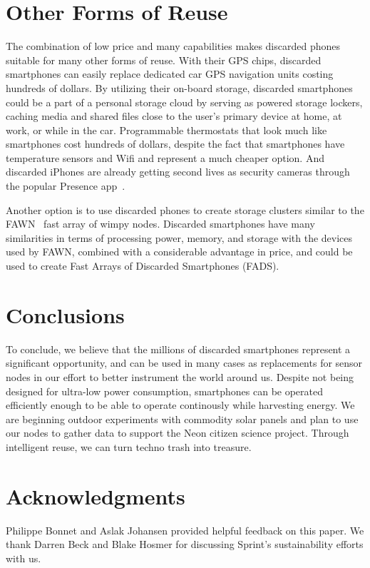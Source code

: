 \section{Other Forms of Reuse}
\label{sec-other}

The combination of low price and many capabilities makes discarded phones
suitable for many other forms of reuse. With their GPS chips, discarded
smartphones can easily replace dedicated car GPS navigation units costing
hundreds of dollars. By utilizing their on-board storage, discarded
smartphones could be a part of a personal storage cloud by serving as powered
storage lockers, caching media and shared files close to the user's primary
device at home, at work, or while in the car. Programmable thermostats that
look much like smartphones cost hundreds of dollars, despite the fact that
smartphones have temperature sensors and Wifi and represent a much cheaper
option. And discarded iPhones are already getting second lives as security
cameras through the popular Presence app~\cite{presence-peoplepower}.

Another option is to use discarded phones to create storage clusters similar
to the FAWN~\cite{fawn} fast array of wimpy nodes. Discarded smartphones have
many similarities in terms of processing power, memory, and storage with the
devices used by FAWN, combined with a considerable advantage in price, and
could be used to create Fast Arrays of Discarded Smartphones (FADS).

\section{Conclusions}
\label{sec-conclusion}

To conclude, we believe that the millions of discarded smartphones represent
a significant opportunity, and can be used in many cases as replacements for
sensor nodes in our effort to better instrument the world around us. Despite
not being designed for ultra-low power consumption, smartphones can be
operated efficiently enough to be able to operate continously while
harvesting energy. We are beginning outdoor experiments with commodity solar
panels and plan to use our nodes to gather data to support the Neon citizen
science project. Through intelligent reuse, we can turn techno trash into
treasure.

\section*{Acknowledgments}

Philippe Bonnet and Aslak Johansen provided helpful feedback on this paper.
We thank Darren Beck and Blake Hosmer for discussing Sprint's sustainability
efforts with us.
